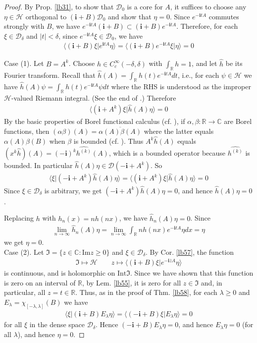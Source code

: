 \documentclass[12pt,b5paper,notitlepage]{article}
\theoremstyle{definition}
\theoremstyle{plain}
\newcommand{\fk}{\mathfrak}
\newcommand{\mc}{\mathcal}
\newcommand{\wht}{\widehat}
\newcommand{\ovl}{\overline}
\newcommand{\Dom}{\scr{D}}
\newcommand{\bk}[1]{\langle {#1}\rangle}
\newcommand{\scr}{\mathscr}
\newcommand{\im}{\mathbf{i}}
\newcommand{\Cbb}{\mathbb C}
\newcommand{\Rbb}{\mathbb R}
\newcommand{\Imag}{\mathrm{Im}}
\newcommand{\Int}{\mathrm{Int}}
\numberwithin{equation}{section}
\begin{document}
\begin{proof}
By Prop. \ref{lb31}, to show that $\Dom_0$ is a core for $A$, it suffices to choose any $\eta\in\mc H$ orthogonal to $(\im+B)\Dom_0$ and show that $\eta=0$. Since $e^{-\im tA}$ commutes strongly with $B$, we have $e^{-\im tA}(\im+B)\subset(\im+B)e^{-\im tA}$. Therefore, for each $\xi\in\Dom_\delta$ and $|t|<\delta$, since $e^{-\im tA}\xi\in\Dom_0$, we have
\begin{align*}
\bk{(\im+B)\xi|e^{\im tA}\eta}=\bk{(\im+B)e^{-\im tA}\xi|\eta}=0
\end{align*}

Case (1). Let $B=A^k$. Choose $h\in C_c^\infty(-\delta,\delta)$ with $\int_\Rbb h=1$, and let $\wht h$ be its Fourier transform. Recall that $\wht h(A)=\int_\Rbb h(t)e^{-\im tA}dt$, i.e., for each $\psi\in\mc H$ we have $\wht h(A)\psi=\int_\Rbb h(t)e^{-\im tA}\psi dt$ where the RHS is understood as the improper $\mc H$-valued Riemann integral. (See the end of \cite[Sec. 10]{Gui-S}.) Therefore
\begin{align*}
\bk{(\im+A^k)\xi|\wht h(A)\eta}=0
\end{align*}
By the basic properties of Borel functional calculus (cf. \cite[Sec. 9]{Gui-S}), if $\alpha,\beta:\Rbb\rightarrow\Cbb$ are Borel functions, then $(\alpha\beta)(A)=\ovl{\alpha(A)\beta(A)}$ where the latter equals $\alpha(A)\beta(B)$ when $\beta$ is bounded (cf. \cite[Prop. 8.1]{Gui-S}). Thus $A^k\wht h(A)$ equals $(x^k\wht h)(A)=(-\im)^k\wht{h^{(k)}}(A)$, which is a bounded operator because $\wht{h^{(k)}}$ is bounded. In particular $\wht h(A)\eta\in\Dom(-\im+A^k)$. So
\begin{align*}
\bk{\xi|(-\im+A^k)\wht h(A)\eta}=\bk{(\im+A^k)\xi|\wht h(A)\eta}=0
\end{align*}
Since $\xi\in\Dom_\delta$ is arbitrary, we get $(-\im+A^k)\wht h(A)\eta=0$, and hence $\wht h(A)\eta=0$. 

Replacing $h$ with $h_n(x)=nh(nx)$, we have $\wht h_n(A)\eta=0$. Since 
\begin{align*}
\lim_{n\rightarrow\infty}\wht h_n(A)\eta=\lim_{n\rightarrow\infty} \int_\Rbb nh(nx)e^{-\im tA}\eta dx=\eta
\end{align*}
we get $\eta=0$.\\[-1ex]

Case (2). Let $\fk I=\{z\in\Cbb:\Imag z\geq0\}$ and $\xi\in\Dom_\delta$. By Cor. \ref{lb57}, the function 
\begin{align*}
\fk I\mapsto\mc H\qquad z\mapsto \bk{(\im+B)\xi|e^{-\im \ovl zA}\eta}
\end{align*}
is continuous, and is holomorphic on $\Int\fk I$. Since we have shown that this function is zero on an interval of $\Rbb$, by Lem. \ref{lb55}, it is zero for all $z\in\fk I$ and, in particular, all $z=t\in\Rbb$. Thus, as in the proof of Thm. \ref{lb58}, for each $\lambda\geq0$ and $E_\lambda=\chi_{[-\lambda,\lambda]}(B)$ we have
\begin{align*}
\bk{\xi|(\im+B)E_\lambda\eta}=\bk{(-\im+B)\xi|E_\lambda\eta}=0
\end{align*}
for all $\xi$ in the dense space $\Dom_\delta$. Hence $(-\im+B)E_\lambda\eta=0$, and hence $E_\lambda\eta=0$ (for all $\lambda$), and hence $\eta=0$.
\end{proof}
\end{document}
